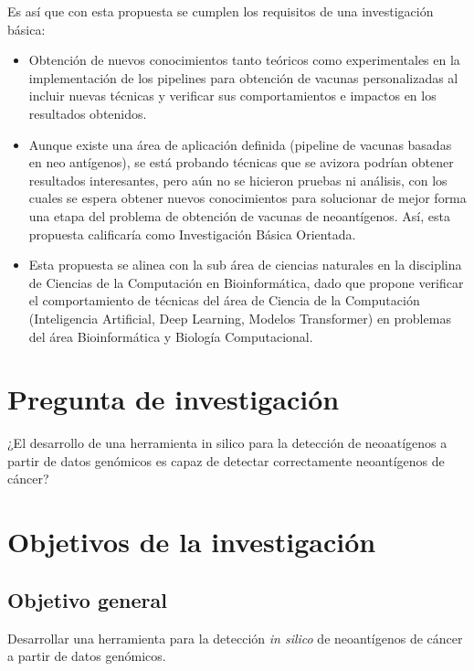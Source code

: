 \documentclass[a4paper,11pt]{article}
\begin{document}
Es así que con esta propuesta se cumplen los requisitos de una investigación básica:

\begin{itemize}
\item Obtención de nuevos conocimientos tanto teóricos como experimentales en la implementación de los pipelines para obtención de vacunas personalizadas al incluir nuevas técnicas y verificar sus comportamientos e impactos en los resultados obtenidos. 
\item Aunque existe una área de aplicación definida (pipeline de vacunas basadas en neo antígenos), se está probando técnicas que se avizora podrían obtener resultados interesantes, pero aún no se hicieron pruebas ni análisis, con los cuales se espera obtener nuevos conocimientos para solucionar de mejor forma una etapa del problema de obtención de vacunas de neoantígenos. Así, esta propuesta calificaría como Investigación Básica Orientada.

\item Esta propuesta se alinea con la sub área de ciencias naturales en la disciplina de Ciencias de la Computación en Bioinformática, dado que propone verificar el comportamiento de técnicas del área de Ciencia de la Computación (Inteligencia Artificial, Deep Learning, Modelos Transformer) en problemas del área Bioinformática y Biología Computacional.
\end{itemize}
	
\section{Pregunta de investigación}	

¿El desarrollo de una herramienta in silico para la detección de neoaatígenos a partir de datos genómicos es capaz de detectar correctamente neoantígenos de cáncer?
	
\section{Objetivos de la investigación}
	
	\subsection{Objetivo general}
	
	Desarrollar una herramienta  para la detección \textit{in silico} de neoantígenos de cáncer a partir de datos genómicos.
	
\end{document}

